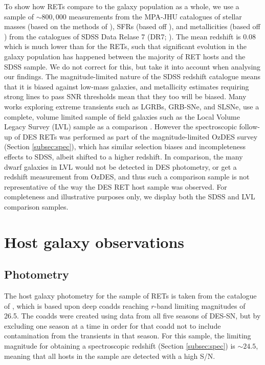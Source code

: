 \documentclass[fleqn,usenatbib,]{mnras}
\newcommand{\replyref}[1]{\color{magenta}#1 \color{black}}
\begin{document}
To show how RETs compare to the galaxy population as a whole, we use a sample of $\sim800,000$ measurements from the MPA-JHU catalogues of stellar masses (based on the methods of \citealt{Kauffmann2003,Salim2007}), SFRs (based off \citealt{Brinchmann2004}), and metallicities (based off \citealt{Tremonti2004}) from the  catalogues of SDSS Data Relase 7 (DR7; \citealt{Abazajian2009}). The mean redshift is 0.08 which is much lower than for the RETs, such that significant evolution in the galaxy population has happened between the majority of RET hosts and the SDSS sample. We do not correct for this, but take it into account when analysing our findings. \replyref{The magnitude-limited nature of the SDSS redshift catalogue means that it is biased against low-mass galaxies, and metallicity estimates requiring strong lines to pass SNR thresholds mean that they too will be biased. Many works exploring extreme transients such as LGRBs, GRB-SNe, and SLSNe, use a complete, volume limited sample of field galaxies such as the Local Volume Legacy Survey (LVL) sample as a comparison \citep[e.g.][]{Chen2017,Modjaz2019,Taggart2019}. However the spectroscopic follow-up of DES RETs was performed as part of the magnitude-limited OzDES survey (Section \ref{subsec:spec}), which has similar selection biases and incompleteness effects to SDSS, albeit shifted to a higher redshift. In comparison, the many dwarf galaxies in LVL would not be detected in DES photometry, or get a redshift measurement from OzDES, and thus such a comparison sample is not representative of the way the DES RET host sample was observed. For completeness and illustrative purposes only, we display both the SDSS and LVL comparison samples.} 

\section{Host galaxy observations}
\label{sec:obs}
\subsection{Photometry \label{subsec:phot}}

The host galaxy photometry for the sample of RETs is taken from the catalogue of , which is based upon deep coadds reaching $r$-band limiting magnitudes of 26.5. The coadds were created using data from all five seasons of DES-SN, but by excluding one season at a time in order for that coadd not to include contamination from the transients in that season. For this sample, the limiting magnitude for obtaining a spectroscopic redshift (Section \ref{subsec:spec}) is $\sim 24.5$, meaning that all hosts in the sample are detected with a high S/N.
\end{document}
